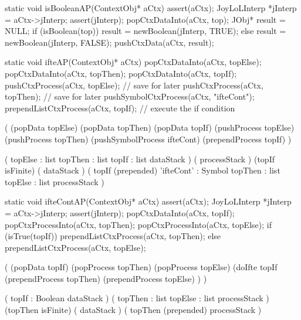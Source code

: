 \startCCode
static void isBooleanAP(ContextObj* aCtx) {
  assert(aCtx);
  JoyLoLInterp *jInterp = aCtx->jInterp;
  assert(jInterp);
  popCtxDataInto(aCtx, top);
  JObj* result = NULL;
  if (isBoolean(top))
    result = newBoolean(jInterp, TRUE);
  else
    result = newBoolean(jInterp, FALSE);
  pushCtxData(aCtx, result);
}
\stopCCode

\stopJoyLoLWord

\startJoyLoLWord[ifte]

\startCCode
static void ifteAP(ContextObj* aCtx) {
  popCtxDataInto(aCtx, topElse);
  popCtxDataInto(aCtx, topThen);
  popCtxDataInto(aCtx, topIf);
  pushCtxProcess(aCtx, topElse); // save for later
  pushCtxProcess(aCtx, topThen); // save for later
  pushSymbolCtxProcess(aCtx, "ifteCont");
  prependListCtxProcess(aCtx, topIf); // execute the if condition
}
\stopCCode

\startImplementation[ansic]
  (
    (popData topElse)
    (popData topThen)
    (popData topIf)
    (pushProcess topElse)
    (pushProcess topThen)
    (pushSymbolProcess ifteCont)
    (prependProcess topIf)
  )
\stopImplementation

\startRule[ifte]
\preDataStack
  (
    topElse : list
    topThen : list
    topIf   : list
    dataStack
  )
\preProcessStack
  (
    processStack
  )
\preConditions
  (topIf isFinite)
\postDataStack
  (
    dataStack
  )
\postProcessStack
  (
    topIf (prepended)
    'ifteCont' : Symbol
    topThen    : list
    topElse    : list
    processStack
  )
\postConditions
\stopRule

\stopJoyLoLWord

\startJoyLoLWord[ifteCont]

\startCCode
static void ifteContAP(ContextObj* aCtx) {
  assert(aCtx);
  JoyLoLInterp *jInterp = aCtx->jInterp;
  assert(jInterp);
  popCtxDataInto(aCtx, topIf);
  popCtxProcessInto(aCtx, topThen);
  popCtxProcessInto(aCtx, topElse);
  if (isTrue(topIf)) {
    prependListCtxProcess(aCtx, topThen);
  } else {
    prependListCtxProcess(aCtx, topElse);
  }
}
\stopCCode

\startImplementation[ansic]
  (
    (popData topIf)
    (popProcess topThen)
    (popProcess topElse)
    (doIfte topIf 
      (prependProcess topThen)
      (prependProcess topElse)
    )
  )
\stopImplementation

\preDataStack
  (
    topIf : Boolean
    dataStack
  )
\preProcessStack
  (
    topThen : list
    topElse : list
    processStack
  )
\preConditions
  (topThen isFinite)
\postDataStack
  (
    dataStack
  )
\postProcessStack
  (
    topThen (prepended)
    processStack
  )
\postConditions
\stopRule

